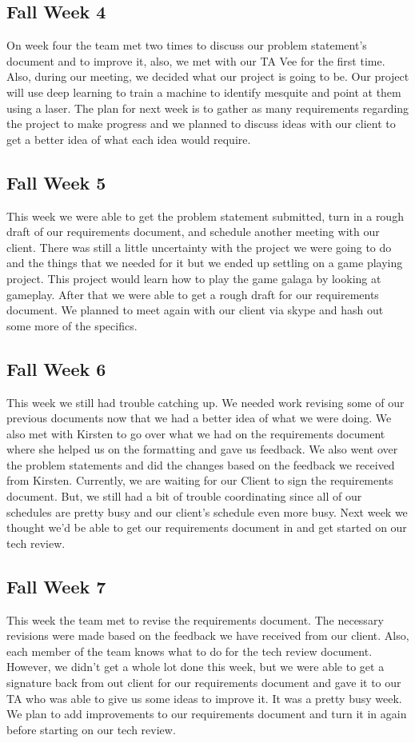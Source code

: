 \documentclass[onecolumn, draftclsnofoot,10pt, compsoc]{IEEEtran}
\begin{document}
\subsection{Fall Week 4}
On week four the team met two times to discuss our problem statement's document and to improve it, also, we met with our TA Vee for the first time.
Also, during our meeting, we decided what our project is going to be.
Our project will use deep learning to train a machine to identify mesquite and point at them using a laser.
The plan for next week is to gather as many requirements regarding the project to make progress and we planned to discuss ideas with our client to get a better idea of what each idea would require.

\subsection{Fall Week 5}
This week we were able to get the problem statement submitted, turn in a rough draft of our requirements document, and schedule another meeting with our client.
There was still a little uncertainty with the project we were going to do and the things that we needed for it but we ended up settling on a game playing project.
This project would learn how to play the game galaga by looking at gameplay.
After that we were able to get a rough draft for our requirements document.
We planned to meet again with our client via skype and hash out some more of the specifics.

\subsection{Fall Week 6}
This week we still had trouble catching up.
We needed work revising some of our previous documents now that we had a better idea of what we were doing.
We also met with Kirsten to go over what we had on the requirements document where she helped us on the formatting and gave us feedback.
We also went over the problem statements and did the changes based on the feedback we received from Kirsten.
Currently, we are waiting for our Client to sign the requirements document.
But, we still had a bit of trouble coordinating since all of our schedules are pretty busy and our client's schedule even more busy.
Next week we thought we'd be able to get our requirements document in and get started on our tech review.

\subsection{Fall Week 7}
This week the team met to revise the requirements document.
The necessary revisions were made based on the feedback we have received from our client.
Also, each member of the team knows what to do for the tech review document.
However, we didn't get a whole lot done this week, but we were able to get a signature back from out client for our requirements document and gave it to our TA who was able to give us some ideas to improve it.
It was a pretty busy week. We plan to add improvements to our requirements document and turn it in again before starting on our tech review.
\end{document}
